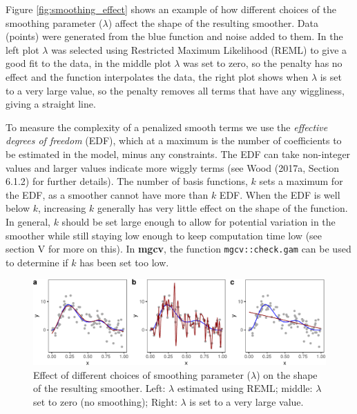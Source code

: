 \documentclass[12pt]{article}
\begin{document}
Figure \ref{fig:smoothing_effect} shows an example of how different
choices of the smoothing parameter (\(\lambda\)) affect the shape of the
resulting smoother. Data (points) were generated from the blue function
and noise added to them. In the left plot \(\lambda\) was selected using
Restricted Maximum Likelihood (REML) to give a good fit to the data, in
the middle plot \(\lambda\) was set to zero, so the penalty has no
effect and the function interpolates the data, the right plot shows when
\(\lambda\) is set to a very large value, so the penalty removes all
terms that have any wiggliness, giving a straight line.

To measure the complexity of a penalized smooth terms we use the
\emph{effective degrees of freedom} (EDF), which at a maximum is the
number of coefficients to be estimated in the model, minus any
constraints. The EDF can take non-integer values and larger values
indicate more wiggly terms (see Wood (2017a, Section 6.1.2) for further
details). The number of basis functions, \(k\) sets a maximum for the
EDF, as a smoother cannot have more than \(k\) EDF. When the EDF is well
below \(k\), increasing \(k\) generally has very little effect on the
shape of the function. In general, \(k\) should be set large enough to
allow for potential variation in the smoother while still staying low
enough to keep computation time low (see section V for more on this). In
\textbf{mgcv}, the function \texttt{mgcv::check.gam} can be used to
determine if \(k\) has been set too low.

\begin{figure}
\includegraphics[width=\linewidth]{../figures/lambda-1} \caption{\label{fig:smoothing_effect}Effect of different choices of smoothing parameter ($\lambda$) on the shape of the resulting smoother. Left:  $\lambda$ estimated using REML; middle: $\lambda$ set to zero (no smoothing); Right: $\lambda$ is set to a very large value.}\label{fig:lambda}
\end{figure}
\end{document}
